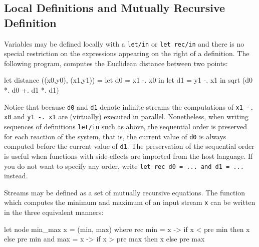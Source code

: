 \documentclass[11pt,titlepage,twoside]{report}
\begin{document}


\subsection{Local Definitions and Mutually Recursive Definition}
\label{sec:local-defin-mutu}
Variables may be defined locally with a \verb-let/in- or
\verb-let rec/in- and there is no special restriction on the
expressions appearing on the right of a definition. The following
program, computes the Euclidean distance between two points:

\begin{runverbatim}
let distance ((x0,y0), (x1,y1)) =
  let d0 = x1 -. x0 in
  let d1 = y1 -. x1 in
  sqrt (d0 *. d0 +. d1 *. d1)
\end{runverbatim}
Notice that because \verb-d0- and \verb-d1- denote infinite streams
the computations of \verb+x1 -. x0+ and \verb+y1 -. x1+ are
(virtually) executed in parallel.  Nonetheless, when writing sequences
of definitions \verb-let/in- such as above, the sequential order is
preserved for each reaction of the system, that is, the current value
of \verb-d0- is always computed before the current value of
\verb-d1-. The preservation of the sequential order is useful when functions
with side-effects are imported from the host language. If you do not want to
specify any order, write \texttt{let rec d0 = ... and d1 = ...} instead.

Streams may be defined as a set of mutually recursive equations.  The
function which computes the minimum and maximum of an input stream
\verb-x- can be written in the three equivalent manners:
\begin{runverbatim}
let node min_max x = (min, max) where
  rec min = x -> if x < pre min then x else pre min
  and max = x -> if x > pre max then x else pre max
\end{runverbatim}
\end{document}
